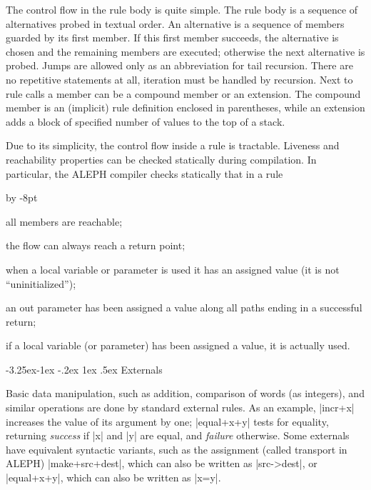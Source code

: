 \documentclass[titlepage]{article}
\makeatletter
\newcommand\A{\textsf{ALEPH}}
\renewenvironment{itemize}{\begin{list}{}{%
\advance\leftmargin by -8pt%
\setlength\itemsep{0ex plus 0.2ex}%
\setlength\partopsep{3pt}%
\setlength\topsep{2pt plus 2pt}%
\setlength\parsep{0pt plus 2pt}%
}}{\end{list}}
\newcommand\g[1]{\textsf{\color{blue!90!black}#1}}
\renewcommand\subsection{%
\@startsection{subsection}{2}{\z@}%
   {-3.25ex\@plus -1ex \@minus -.2ex}%
   {1ex \@plus .5ex}%
   {\normalfont\normalsize\bfseries}}
\makeatother
\begin{document}
The control flow in the rule body is quite simple. The rule body is a sequence of
alternatives probed in textual order. An alternative is a
sequence of members guarded by its first member. If this first member
succeeds, the alternative is chosen and the remaining members are executed;
otherwise the next alternative is probed. Jumps are allowed only as an
abbreviation for tail recursion. There are no repetitive statements at all,
iteration must be handled by recursion. Next to rule calls a member can be a
\g{compound member} or an \g{extension}. The compound member is an
(implicit) rule definition enclosed in parentheses, while an extension adds
a block of specified number of values to the top of a \g{stack}.

Due to its simplicity, the control flow inside a rule is tractable.
Liveness and reachability properties can be checked statically during
compilation. In particular, the \A{} compiler checks statically that in a
rule
\begin{itemize}
\item[\textbullet] all members are reachable;
\item[\textbullet] the flow can always reach a return point;
\item[\textbullet] when a local variable or parameter is used it has an
  assigned value (it is not ``uninitialized'');
\item[\textbullet] an out parameter has been assigned a value along all paths
 ending in a successful return;
\item[\textbullet] if a local variable (or parameter) has been assigned a
value, it is actually used.
\end{itemize}

\subsection{Externals}\label{subsec:bird-ext}

Basic data manipulation, such as addition, comparison of words (as
integers), and similar operations are done by standard external rules. As
an example, \pp|incr+x| increases the value of its argument by one;
\pp|equal+x+y| tests for equality, returning \emph{success} if \pp|x| and
\pp|y| are equal, and \emph{failure} otherwise. Some externals have
equivalent syntactic variants, such as the assignment (called \g{transport}
in \A) \pp|make+src+dest|, which can also be written as \pp|src->dest|, or
\pp|equal+x+y|, which can also be written as \pp|x=y|.
\end{document}
